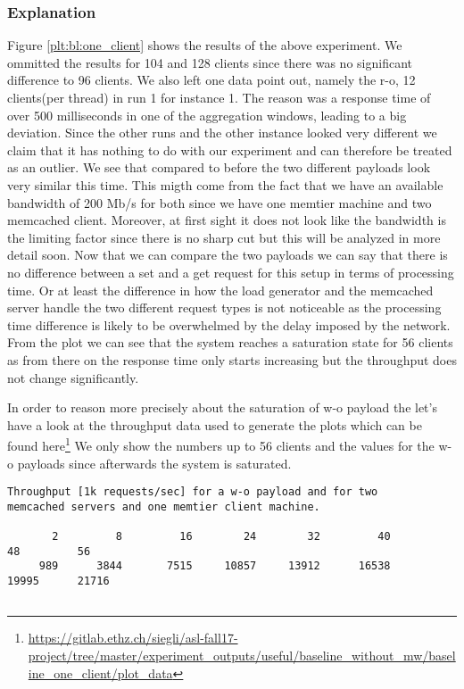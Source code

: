 \documentclass[11pt,a4paper]{article}
\makeatletter
\newcommand{\verbatimfont}[1]{\renewcommand{\verbatim@font}{\ttfamily#1}}
\makeatother
\begin{document}
\subsubsection{Explanation}
Figure \ref{plt:bl:one_client} shows the results of the above experiment. We ommitted the results for 104 and 128 clients since there was no significant difference to 96 clients. We also left one data point out, namely the r-o, 12 clients(per thread) in run 1 for instance 1. The reason was a response time of over 500 milliseconds in one of the aggregation windows, leading to a big deviation. Since the other runs and the other instance looked very different we claim that it has nothing to do with our experiment and can therefore be treated as an outlier. We see that compared to before the two different payloads look very similar this time. This migth come from the fact that we have an available bandwidth of 200 Mb/s for both since we have one memtier machine and two memcached client. Moreover, at first sight it does not look like the bandwidth is the limiting factor since there is no sharp cut but this will be analyzed in more detail soon. Now that we can compare the two payloads we can say that there is no difference between a set and a get request for this setup in terms of processing time. Or at least the difference in how the load generator and the memcached server handle the two different request types is not noticeable as the processing time difference is likely to be overwhelmed by the delay imposed by the network. From the plot we can see that the system reaches a saturation state for 56 clients as from there on the response time only starts increasing but the throughput does not change significantly.

 In order to reason more precisely about the saturation of w-o payload the let's have a look at the throughput data used to generate the plots which can be found here\footnote{\url{https://gitlab.ethz.ch/siegli/asl-fall17-project/tree/master/experiment_outputs/useful/baseline_without_mw/baseline_one_client/plot_data}} We only show the numbers up to 56 clients and the values for the w-o payloads since afterwards the system is saturated.
\verbatimfont{\small}%
\begin{verbatim}
Throughput [1k requests/sec] for a w-o payload and for two 
memcached servers and one memtier client machine.

       2         8         16        24        32         40         48         56    
     989      3844       7515     10857     13912      16538      19995      21716    


\end{verbatim}
\end{document}
